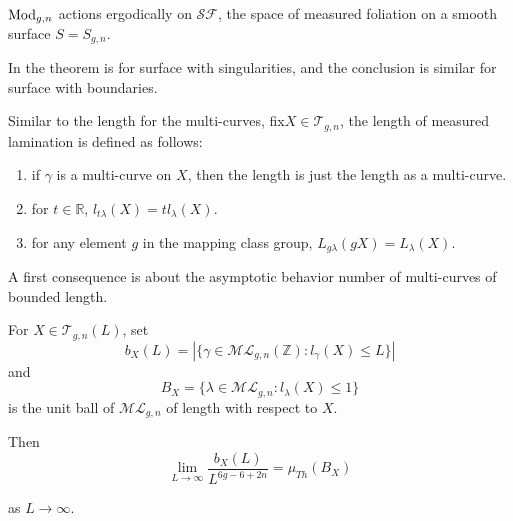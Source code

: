 \begin{theorem}\label{ergodictheorem}
$\operatorname{Mod}_{g,n}$ actions ergodically on $\mathscr{SF}$, the space  of measured foliation on  a smooth surface $S=S_{g,n}$.
\end{theorem}

\begin{remark}
In \cite{ergodic} the theorem is for surface with singularities, and the conclusion is similar for surface with  boundaries.
\end{remark}

Similar to  the length for the multi-curves, fix$X\in \mathscr{T}_{g,n}$, the length of measured lamination is defined as follows:
\begin{enumerate}
    \item if $\gamma$ is a multi-curve on $X$, then the length is  just the length as a  multi-curve.
    \item for $t\in \mathbb{R}$, $l_{t\lambda}(X)=t l_\lambda(X)$.
    \item for any element $g$ in the mapping class group, $L_{g\lambda}(gX)=L_{\lambda}(X)$. 
\end{enumerate}



A first consequence is about the asymptotic behavior  number of  multi-curves of bounded length. 


\begin{theorem}\label{bxlbehavior}
For $X\in \mathscr{T}_{g,n}(L)$,
set  $$b_X(L)=|\{\gamma\in \mathscr{ML}_{g,n}(\mathbb{Z}):l_\gamma(X)\leq L\}|$$
 and $$B_X=\{\lambda\in \mathscr{ML}_{g,n}:l_{\lambda}(X)\leq 1\}$$ 
  is the unit ball of $\mathscr{ML}_{g,n}$ of length with respect to $X$.

Then 
 \begin{equation}
     \lim_{L\to \infty} \frac{b_X(L)}{L^{6g-6+2n}}= \mu_{Th}(B_X)
 \end{equation}

 
as $L\to \infty$.

\end{theorem}

